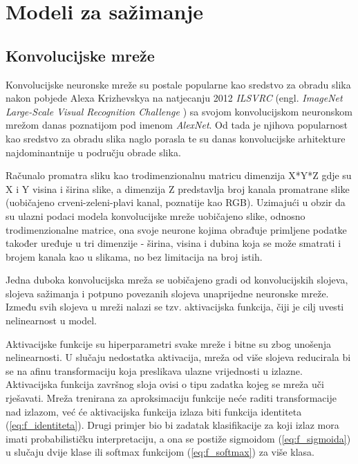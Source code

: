 \documentclass[times, utf8, proizvoljni, numeric]{fer}
\begin{document}
\chapter{Modeli za sažimanje}

\section{Konvolucijske mreže}

Konvolucijske neuronske mreže su postale popularne kao sredstvo za obradu slika nakon pobjede Alexa Krizhevskya na natjecanju 2012 \textit{ILSVRC} (engl. \textit{ImageNet Large-Scale Visual Recognition Challenge} \cite{ILSVRC15}) sa svojom konvolucijskom neuronskom mrežom danas poznatijom pod imenom \textit{AlexNet}. Od tada je njihova popularnost kao sredstvo za obradu slika naglo porasla te su danas konvolucijske arhitekture najdominantnije u području obrade slika.

Računalo promatra sliku kao trodimenzionalnu matricu dimenzija X*Y*Z gdje su X i Y visina i širina slike, a dimenzija Z predstavlja broj kanala promatrane slike (uobičajeno crveni-zeleni-plavi kanal, poznatije kao RGB). Uzimajući u obzir da su ulazni podaci modela konvolucijske mreže uobičajeno slike, odnosno trodimenzionalne matrice, ona svoje neurone kojima obrađuje primljene podatke također uređuje u tri dimenzije - širina, visina i dubina koja se može smatrati i brojem kanala kao u slikama, no bez limitacija na broj istih.

Jedna duboka konvolucijska mreža se uobičajeno gradi od konvolucijskih slojeva, slojeva sažimanja i potpuno povezanih slojeva unaprijedne neuronske mreže. Između svih slojeva u mreži nalazi se tzv. aktivacijska funkcija, čiji je cilj uvesti nelinearnost u model.

Aktivacijske funkcije su hiperparametri svake mreže i bitne su zbog unošenja nelinearnosti. U slučaju nedostatka aktivacija, mreža od više slojeva reducirala bi se na afinu transformaciju koja preslikava ulazne vrijednosti u izlazne.  Aktivacijska funkcija završnog sloja ovisi o tipu zadatka kojeg se mreža uči rješavati. Mreža trenirana za aproksimaciju funkcije neće raditi transformacije nad izlazom, već će aktivacijska funkcija izlaza biti funkcija identiteta (\ref{eq:f_identiteta}). Drugi primjer bio bi zadatak klasifikacije za koji izlaz mora imati probabilističku interpretaciju, a ona se postiže sigmoidom (\ref{eq:f_sigmoida}) u slučaju dvije klase ili softmax funkcijom (\ref{eq:f_softmax}) za više klasa. 
\end{document}

